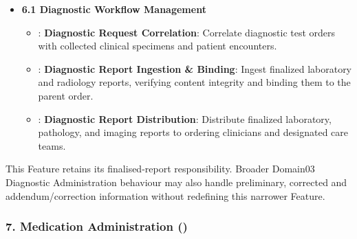 \begin{itemize}

\item 
\textbf{6.1 Diagnostic Workflow Management}


\begin{itemize}

\item 
\texttt{}: \textbf{Diagnostic Request Correlation}: Correlate diagnostic test orders with collected clinical specimens and patient encounters.



\item 
\texttt{}: \textbf{Diagnostic Report Ingestion \& Binding}: Ingest finalized laboratory and radiology reports, verifying content integrity and binding them to the parent order.



\item 
\texttt{}: \textbf{Diagnostic Report Distribution}: Distribute finalized laboratory, pathology, and imaging reports to ordering clinicians and designated care teams.



\end{itemize}


\end{itemize}
\label{rad:enabling:314}

This Feature retains its finalised-report responsibility. Broader Domain03 Diagnostic Administration behaviour may also handle preliminary, corrected and addendum/\allowbreak{}correction information without redefining this narrower Feature.

\label{rad:enabling:316}
\subsubsection*{7. Medication Administration (\texttt{})}
\label{rad:enabling:317}

